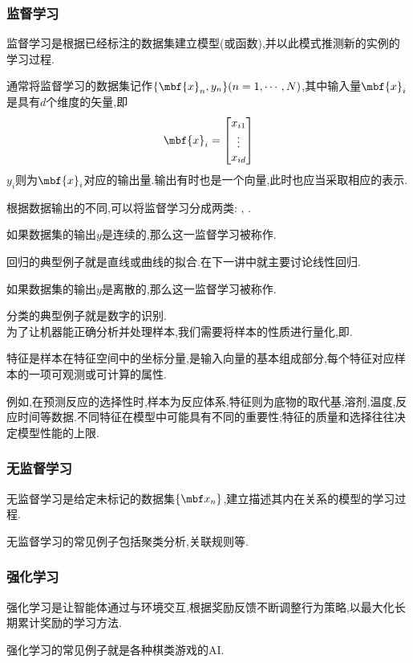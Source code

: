 \documentclass{ctexart}
\begin{document}
\subsubsection{监督学习}
\begin{definition}[监督学习]
    监督学习是根据已经标注的数据集建立模型(或函数),并以此模式推测新的实例的学习过程.
\end{definition}
\begin{notation}[数据集]
    通常将监督学习的数据集记作$\{\mbf{x}_n,y_n\}(n=1,\cdots,N)$,其中输入量$\mbf{x}_i$是具有$d$个维度的矢量,即
    \[\mbf{x}_i=\begin{bmatrix}
        x_{i1}\\\vdots\\x_{id}
    \end{bmatrix}\]
    $y_i$则为$\mbf{x}_i$对应的输出量.输出有时也是一个向量,此时也应当采取相应的表示.
\end{notation}
根据数据输出的不同,可以将监督学习分成两类: , .
\begin{definition}[回归]
    如果数据集的输出$y$是连续的,那么这一监督学习被称作.
\end{definition}
回归的典型例子就是直线或曲线的拟合.在下一讲中就主要讨论线性回归.
\begin{definition}[分类]
    如果数据集的输出$y$是离散的,那么这一监督学习被称作.
\end{definition}
分类的典型例子就是数字的识别.\\
\indent 为了让机器能正确分析并处理样本,我们需要将样本的性质进行量化,即.
\begin{definition}[特征]
    特征是样本在特征空间中的坐标分量,是输入向量的基本组成部分,每个特征对应样本的一项可观测或可计算的属性.
\end{definition}
例如,在预测反应的选择性时,样本为反应体系,特征则为底物的取代基,溶剂,温度,反应时间等数据.不同特征在模型中可能具有不同的重要性;特征的质量和选择往往决定模型性能的上限.
\subsubsection{无监督学习}
\begin{definition}[无监督学习]
    无监督学习是给定未标记的数据集$\{\mbf x_n\}$,建立描述其内在关系的模型的学习过程.
\end{definition}
无监督学习的常见例子包括聚类分析,关联规则等.
\subsubsection{强化学习}
\begin{definition}[强化学习]
    强化学习是让智能体通过与环境交互,根据奖励反馈不断调整行为策略,以最大化长期累计奖励的学习方法.
\end{definition}
强化学习的常见例子就是各种棋类游戏的AI.
\end{document}
